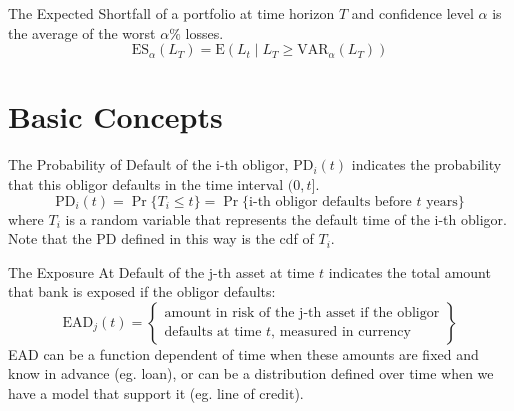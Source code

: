 \documentclass[11pt,fleqn]{book} %
\begin{document}
\begin{definition}
	The Expected Shortfall of a portfolio at time horizon $T$ and 
	confidence level $\alpha$ is the average of the worst $\alpha\%$ losses.
	\begin{displaymath}
		\text{ES}_\alpha(L_T) = \text{E}(L_t \mid L_T \ge \text{VAR}_\alpha(L_T))
	\end{displaymath}
\end{definition}

\section{Basic Concepts}

\begin{definition}
	The Probability of Default of the i-th obligor, $\text{PD}_i(t)$
	indicates the probability that this obligor defaults in the time 
	interval $(0,t]$.
	\begin{displaymath}
		\text{PD}_i(t) = \Pr\{T_i \le t\} = 
		\Pr\{\text{i-th obligor defaults before $t$ years}\}
	\end{displaymath}
	where $T_i$ is a random variable that represents the default
	time of the i-th obligor. Note that the PD defined in this way 
	is the cdf of $T_i$.
\end{definition}

\begin{definition}
	The Exposure At Default of the j-th asset at time $t$ indicates 
	the total amount that bank is exposed if the obligor defaults:
	\begin{displaymath}
		\text{EAD}_j(t) = \left\{
		\begin{array}{c}
			\text{amount in risk of the j-th asset if the obligor} \\
			\text{defaults at time $t$, measured in currency}
		\end{array}
		\right\}
	\end{displaymath}
	EAD can be a function dependent of time when these amounts are
	fixed and know in advance (eg. loan), or can be a distribution
	defined over time when we have a model that support it 
	(eg. line of credit).
\end{definition}
\end{document}
